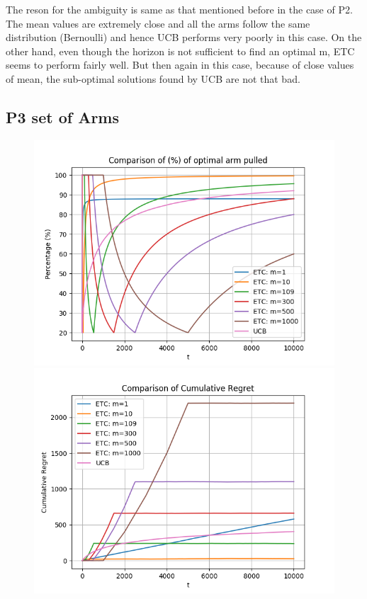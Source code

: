 \documentclass[12pt]{report}
\begin{document}
		\noindent The reson for the ambiguity is same as that mentioned before in the case of P2. The mean values are extremely close and all the arms follow the same distribution (Bernoulli) and hence UCB performs very poorly in this case. On the other hand, even though the horizon is not sufficient to find an optimal m, ETC seems to perform fairly well. But then again in this case, because of close values of mean, the sub-optimal solutions found by UCB are not that bad.
		
		\subsection{P3 set of Arms}
			\begin{figure}[H]
				\includegraphics[scale=0.85]{Figures/Combined_op_P3.png}
				\includegraphics[scale=0.85]{Figures/Combined_regret_P3.png}
			\end{figure}
			
\end{document}

